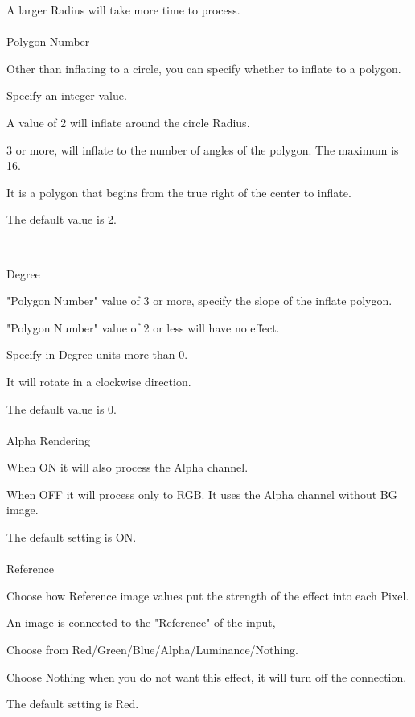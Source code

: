\documentclass[a4paper,12pt]{article}
\begin{document}
A larger Radius will take more time to process.\\
\\
Polygon Number\par
Other than inflating to a circle, you can specify whether to inflate to a polygon.\par
Specify an integer value.\par
A value of 2 will inflate around the circle Radius.\par
3 or more, will inflate to the number of angles of the polygon. The maximum is 16.\par
It is a polygon that begins from the true right of the center to inflate.\par
The default value is 2.

\newpage

\thispagestyle{empty}

\ \vspace{-0.2em}
\\
\par
\noindent Degree\par
"Polygon Number" value of 3 or more, specify the slope of the inflate polygon.\par
"Polygon Number" value of 2 or less will have no effect.\par
Specify in Degree units more than 0.\par
It will rotate in a clockwise direction.\par
The default value is 0.\\
\\
Alpha Rendering\par
When ON it will also process the Alpha channel.\par
When OFF it will process only to RGB. It uses the Alpha channel without BG image.\par
The default setting is ON.\\
\\
Reference\par
Choose how Reference image values put the strength of the effect into each Pixel.\par
An image is connected to the "Reference" of the input,\par
Choose from Red/Green/Blue/Alpha/Luminance/Nothing.\par
Choose Nothing when you do not want this effect, it will turn off the connection.\par
The default setting is Red.
\end{document}
